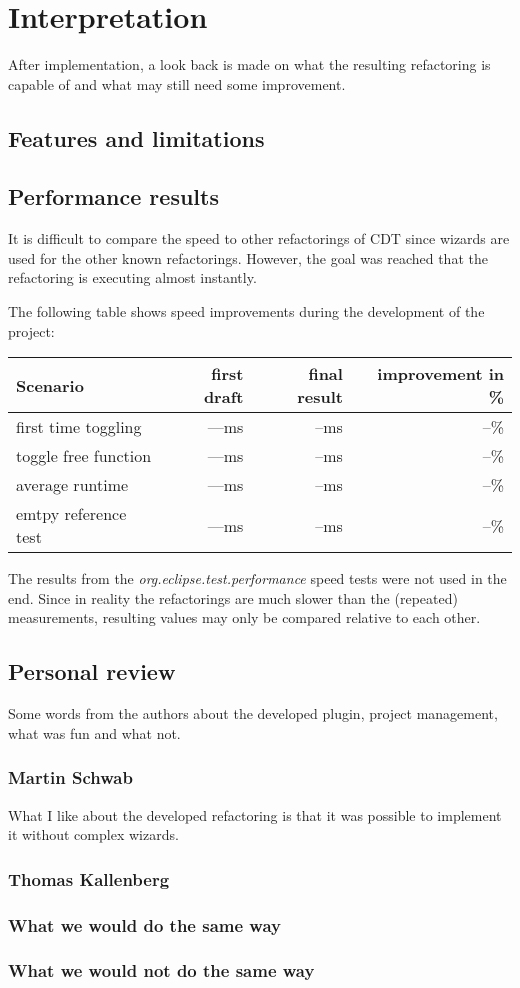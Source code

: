 \chapter{Interpretation}
\thispagestyle{fancy}

After implementation, a look back is made on what the resulting refactoring is 
capable of and what may still need some improvement.

\section{Features and limitations}



\section{Performance results}

It is difficult to compare the speed to other refactorings of CDT since wizards 
are used for the other known refactorings. However, the goal was reached that 
the refactoring is executing almost instantly.

The following table shows speed improvements during the development of the 
project:

\begin{tabular}[t]{l|rrr}
 Scenario   & first draft & final result & improvement in \% \\
 \hline
 first time toggling 	&  ---ms & --ms & --\% \\
 toggle free function	&  ---ms & --ms & --\% \\
 average runtime	&  ---ms & --ms & --\% \\
 emtpy reference test	&  ---ms & --ms & --\% \\
\end{tabular}

The results from the \textit{org.eclipse.test.performance} speed tests were not 
used in the end. Since in reality the refactorings are much slower than the 
(repeated) measurements, resulting values may only be compared relative to each 
other.

\section{Personal review}

Some words from the authors about the developed plugin, project management, what 
was fun and what not.

\subsection{Martin Schwab}

What I like about the developed refactoring is that it was possible to implement 
it without complex wizards. 

\subsection{Thomas Kallenberg}


\subsection{What we would do the same way}


\subsection{What we would not do the same way}

